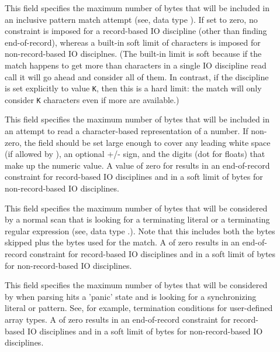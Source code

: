 \begin{description}
\item[] This field specifies the maximum number of
  bytes that will be included in an inclusive pattern match attempt
  (see, \eg{} data type ).  If set to zero, no
   constraint is imposed for a record-based IO
  discipline (other than finding end-of-record), whereas a built-in
  soft limit of  characters is imposed for
  non-record-based IO disciplnes.  (The built-in limit is soft because
  if the match happens to get more than 
  characters in a single IO discipline read call it will go ahead and
  consider all of them.  In contrast, if the discipline
   is set explicitly to value \texttt{K}, then this is
  a hard limit: the match will only consider \texttt{K} characters
  even if more are available.)

\item[] This field specifies the maximum number of
   bytes that will be included in an attempt to read a character-based
   representation of a number.  If non-zero, the field should be set
   large enough to cover any leading white space (if allowed by
   ), an optional +/- sign, and the digits (dot
   \etc{} for floats) that make up the numeric value.  A value of zero
   for  results in an end-of-record constraint for
   record-based IO disciplines and in a soft limit of
    bytes for non-record-based IO
   disciplines.

\item[] This field specifies the maximum number of bytes
   that will be considered by a normal scan that is looking for a
   terminating literal or a terminating regular expression (see, \eg{}
   data type .).  Note that this includes both the
   bytes skipped plus the bytes used for the match.  A 
   of zero results in an end-of-record constraint for record-based IO
   disciplines and in a soft limit of  bytes
   for non-record-based IO disciplines.
  
\item[] This field specifies the maximum number of
  bytes that will be considered by when 
  parsing hits a 'panic' state and is looking for a synchronizing
  literal or pattern.  See, for example, termination conditions for
  user-defined array types.  A  of zero results in an
  end-of-record constraint for record-based IO disciplines and in a
  soft limit of  bytes for non-record-based IO
  disciplines.
\end{description}


